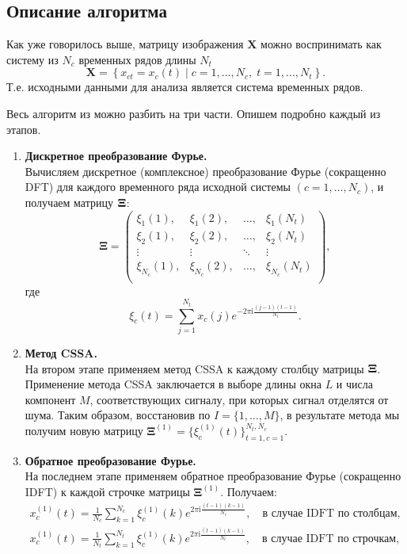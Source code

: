 \documentclass[specialist,
               substylefile = spbu.rtx,
               subf,href,colorlinks=true, 12pt]{disser}
\newcommand{\I}{\mathrm{i}}
\begin{document}
{{\subsection{Описание алгоритма}
\label{sec:use_cssa_algorithm}
Как уже говорилось выше, матрицу изображения $\mathbf{X}$ можно воспринимать как систему из $N_c$ временных рядов длины $N_t$
\begin{equation*}
	\mathbf{X}=\left\{x_{ct}=x_c(t) \; | \; c=1, \ldots, N_c, \; t=1, \ldots, N_t\right\}.
\end{equation*}
Т.е. исходными данными для анализа является система временных рядов.

    Весь алгоритм из \cite{Trickett2003} можно разбить на три части. 
    Опишем подробно каждый из этапов.

\begin{enumerate}
\item
{\bf Дискретное преобразование Фурье.\\}
    Вычисляем дискретное (комплексное) преобразование Фурье (сокращенно DFT)
    для каждого временного ряда исходной системы $(c=1, \ldots, N_c)$,
    и получаем матрицу $\bf\Xi$:
\begin{equation*}
\mathbf\Xi =
\left(
\begin{array}{cccc}
    \xi_1(1), & \xi_1(2), & \ldots, & \xi_1(N_t)\\
    \xi_2(1), & \xi_2(2), & \ldots, & \xi_2(N_t)\\
    \vdots & \vdots & \ddots & \vdots\\
    \xi_{N_c}(1), & \xi_{N_c}(2), & \ldots, & \xi_{N_c}(N_t)\\
\end{array}
\right),
\end{equation*}
   где
\begin{equation*}
    \xi_c(t) = \sum_{j=1}^{N_t}x_c(j)e^{-2\pi \I \frac{(j-1)(t-1)}{N_t}}.
\end{equation*}

\item
{\bf Метод CSSA.\\}
На втором этапе применяем метод CSSA
 к каждому столбцу матрицы $\bf\Xi$. 
Применение метода CSSA заключается в выборе длины окна $L$ и числа компонент $M$, соответствующих сигналу,  при которых сигнал отделятся от шума.
Таким образом, восстановив по $I = \{1,\ldots,M\}$, в результате метода мы получим новую матрицу $\mathbf{\Xi}^{(1)} = \{\xi^{(1)}_c(t)\}_{t=1, c=1}^{N_t, N_c}$.

\item
{\bf Обратное преобразование Фурье.\\}
На последнем этапе применяем обратное преобразование Фурье (сокращенно IDFT)
к каждой строчке матрицы $\mathbf{\Xi}^{(1)}$. 
Получаем:
\begin{gather*}
     x_c^{(1)}(t) = \frac{1}{N_c}\sum_{k=1}^{N_c}\xi_c^{(1)}(k)e^{2\pi \I \frac{(t-1)(k-1)}{N_c}},
    \quad \text{в случае IDFT по столбцам}, \\
     x_c^{(1)}(t) = \frac{1}{N_t}\sum_{k=1}^{N_t}\xi_c^{(1)}(k)e^{2\pi \I \frac{(t-1)(k-1)}{N_t}},
    \quad \text{в случае IDFT по строчкам},
\end{gather*}


\end{enumerate}}}
\end{document}
